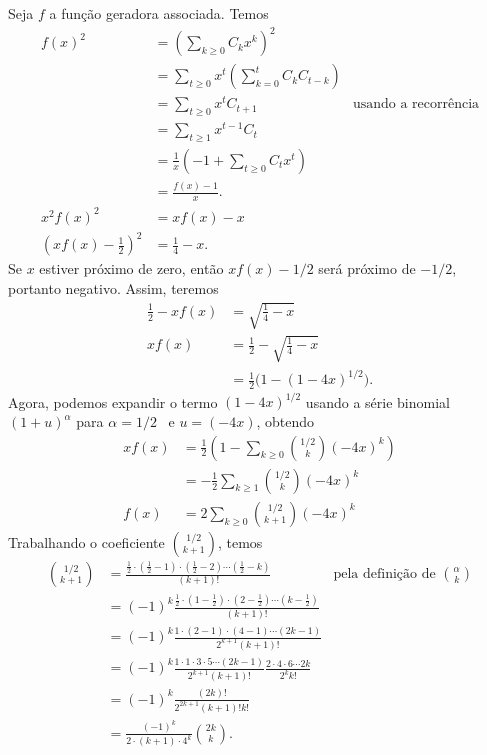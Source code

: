 Seja $f$ a função geradora associada.
Temos
\begin{align*}
    f(x)^2 &= \left(\sum_{k \geq 0} C_k x^k\right)^2 \\
           &= \sum_{t \geq 0} x^t \left( \sum_{k = 0}^t C_k C_{t-k} \right) \\
           &= \sum_{t \geq 0} x^t C_{t+1}
            & \text{usando a recorrência}\\
           &= \sum_{t \geq 1} x^{t-1} C_t \\
           &= \frac 1 x \left( -1 + \sum_{t \geq 0} C_t x^t \right) \\
           &= \frac{f(x) - 1}{x}. \\
    x^2 f(x)^2 &= xf(x) - x \\
    \left(xf(x) - \frac 1 2\right)^2 &= \frac 1 4 - x.
\end{align*}
Se $x$ estiver próximo de zero,
então $xf(x) - 1/2$ será próximo de $-1/2$,
portanto negativo.
Assim, teremos
\begin{align*}
    \frac 1 2 - xf(x) &= \sqrt{\frac 1 4 - x} \\
    xf(x) &= \frac 1 2 - \sqrt{\frac 1 4 - x} \\
          &= \frac 1 2 \big(1 - (1 - 4x)^{1/2}\big).
\end{align*}
Agora, podemos expandir o termo $(1 - 4x)^{1/2}$
usando a série binomial $(1 + u)^\alpha$ para $\alpha = 1/2$~\cite[p.~487]{Spivak1994}
e $u = (-4x)$,
obtendo
\begin{align*}
    xf(x) &= \frac 1 2 \left( 1 - \sum_{k \geq 0} \binom{1/2}{k} (-4x)^k \right) \\
          &= -\frac 1 2 \sum_{k \geq 1} \binom{1/2}{k} (-4x)^k \\
    f(x) &= 2 \sum_{k \geq 0} \binom{1/2}{k+1} (-4x)^k
\end{align*}
Trabalhando o coeficiente $\binom{1/2}{k+1}$, temos
\begin{align*}
    \binom{1/2}{k+1} &= \frac{
        \frac 1 2 \cdot (\frac 1 2 - 1) \cdot (\frac 1 2 - 2) \cdots (\frac 1 2 - k)
    }{ (k+1)! } & \text{pela definição de $\textstyle \binom \alpha k$}\\
    &= (-1)^k \frac{
        \frac 1 2 \cdot (1 - \frac 1 2) \cdot (2 - \frac 1 2) \cdots (k - \frac 1 2)
    }{ (k+1)! } \\
    &= (-1)^k \frac{
        1 \cdot (2 - 1) \cdot (4 - 1) \cdots (2k - 1)
    }{ 2^{k + 1} (k + 1)! } \\
    &= (-1)^k \frac{ 1 \cdot 1 \cdot 3 \cdot 5 \cdots (2k - 1) }{2^{k+1} (k+1)!}
        \frac{2 \cdot 4 \cdot 6 \cdots 2k}{2^k k!} \\
    &= (-1)^k \frac{ (2k)! }{2^{2k+1} (k+1)! k!} \\
    &= \frac{(-1)^k}{2 \cdot (k+1) \cdot 4^k} \binom{2k}{k}.
\end{align*}
